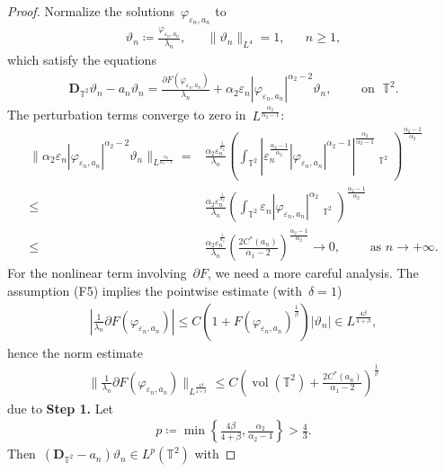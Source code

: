 \documentclass[10pt,a4paper]{amsart}
\newcommand{\p}{\partial}
\newcommand{\T}{\mathbb{T}}
\newcommand{\dd}{\mathop{}\!\mathrm{d}}
\newcommand{\eps}{\varepsilon}
\newcommand{\pD}{\mathbf{D}}
\newcommand{\parenthesis}[1]{\left(#1\right)} %
\newcommand{\braces}[1]{\left\{#1\right\}} %
\DeclareMathOperator{\dv}{\dd{vol}}
\DeclareMathOperator{\vol}{vol}
\begin{document}
\begin{proof}
Normalize the solutions~$\varphi_{\eps_n,a_n}$ to
\begin{align}
    \vartheta_n\coloneqq \frac{\varphi_{\eps_n,a_n}}{\lambda_n}, & & \|\vartheta_n\|_{L^4}=1, & & n\geq 1,
\end{align}
which satisfy the equations
\begin{align}\label{eq:normalized eqn}
    \pD_{\T^2}\vartheta_n-a_n\vartheta_n=\frac{\p F(\varphi_{\eps_n,a_n})}{\lambda_n} + \alpha_2\eps_n |\varphi_{\eps_n,a_n}|^{\alpha_2 -2 }\vartheta_n, \qquad \mbox{ on } \; \mathbb{T}^2.
\end{align}
The perturbation terms converge to zero in~$L^{\frac{\alpha_2}{\alpha_2-1}}$:
\begin{align}
    \|\alpha_2\eps_n |\varphi_{\eps_n,a_n}|^{\alpha_2 -2 }\vartheta_n \|_{L^{\frac{\alpha_2}{\alpha_2 -1}}}
    = & \frac{\alpha_2 \eps_n^{\frac{1}{\alpha_2}} }{\lambda_n}
     \parenthesis{ \int_{\mathbb{T}^2} \left|\eps_n^{\frac{\alpha_2-1}{\alpha_2}} |\varphi_{\eps_n,a_n}|^{\alpha_2 -1} \right|^{\frac{\alpha_2}{\alpha_2-1}} \dv_{\T^2}   }^{\frac{\alpha_2-1}{\alpha_2}}\\
    \leq& \frac{\alpha_2 \eps_n^{\frac{1}{\alpha_2}} }{\lambda_n}
    \parenthesis{ \int_{\mathbb{T}^2} \eps_n |\varphi_{\eps_n,a_n}|^{\alpha_2}\dv_{\T^2}}^{\frac{\alpha_2-1}{\alpha_2}} \\
    \leq& \frac{\alpha_2 \eps_n^{\frac{1}{\alpha_2}} }{\lambda_n}\parenthesis{ \frac{2C^*(a_n)}{\alpha_1-2} }^{\frac{\alpha_2-1}{\alpha_2}} \to 0 ,\qquad \mbox{ as } n\to+\infty. 
\end{align}
For the nonlinear term involving~$\p F$, we need a more careful analysis.
The assumption (F5) implies the pointwise estimate (with~$\delta=1$)
\begin{align}
    \left|\frac{1}{\lambda_n} \p F(\varphi_{\eps_n,a_n})\right|
    \leq C \parenthesis{1+ F(\varphi_{\eps_n,a_n})^{\frac{1}{\beta}}} |\vartheta_n| \in L^{\frac{4\beta}{4+\beta}},
\end{align}
hence the norm estimate
\begin{align}
    \|\frac{1}{\lambda_n}\p F(\varphi_{\eps_n,a_n})\|_{L^{\frac{4\beta}{4+\beta}}}
    \leq C \parenthesis{ \vol(\mathbb{T}^2)+\frac{2 C^*(a_n)}{\alpha_1-2} }^{\frac{1}{\beta}}
\end{align}
due to \noindent\textbf{Step 1.}
Let 
\begin{align}
    p\coloneqq \min\braces{ \frac{4\beta}{4+\beta}, \frac{\alpha_2}{\alpha_2-1} } >\frac{4}{3}. 
\end{align}
Then~$ (\pD_{\T^2}-a_n)\vartheta_n \in L^p(\mathbb{T}^2)$ with

\end{proof}
\end{document}
